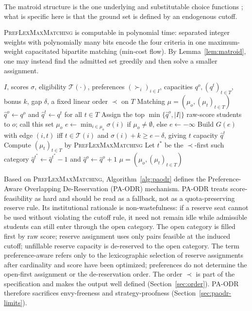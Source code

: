 \documentclass[runningheads]{llncs}
\newcommand{\T}{\mathcal{T}}
\begin{document}
The matroid structure is the one underlying \cite{Flei03a} and substitutable choice functions \cite{GKK+17a,KoSo16a}; what is specific here is that the ground set is defined by an endogenous cutoff.

\begin{nremark}[Computation]
\label{rem:computation}
\textsc{PrefLexMaxMatching} is computable in polynomial time: separated integer weights with polynomially many bits encode the four criteria in one maximum-weight capacitated bipartite matching (min-cost flow). By Lemma~\ref{lem:matroid}, one may instead find the admitted set greedily and then solve a smaller assignment.
\end{nremark}

\begin{algorithm}[t]
\caption{Preference-Aware Overlapping De-Reservation (PA-ODR)}
\label{alg:paodr}
\begin{algorithmic}[1]
\Require $I$, scores $\sigma$, eligibility $\T(\cdot)$, preferences $(\succ_i)_{i\in I}$, capacities $q^o,(q^t)_{t\in T}$, bonus $k$, gap $\delta$, a fixed linear order $\prec$ on $T$
\Ensure Matching $\mu=(\mu_o,(\mu_t)_{t\in T})$
\State $\hat q^o\gets q^o$ and $\hat q^t\gets q^t$ for all $t\in T$
\Loop
    \State Assign the top $\min\{\hat q^o,|I|\}$ raw-score students to $o$; call this set $\mu_o$
    \State $e\gets\min_{i\in\mu_o}\sigma(i)$ if $\mu_o\neq\emptyset$, else $e\gets-\infty$
    \State Build $G(e)$ with edge $(i,t)$ iff $t\in\T(i)$ and $\sigma(i)+k\ge e-\delta$, giving $t$ capacity $\hat q^t$
    \State Compute $(\mu_t)_{t\in T}$ by \textsc{PrefLexMaxMatching}
        \State Let $t^\ast$ be the $\prec$-first such category
        \State $\hat q^{t^\ast}\gets\hat q^{t^\ast}-1$ and $\hat q^o\gets\hat q^o+1$
    \Else
        \State \Return $\mu=(\mu_o,(\mu_t)_{t\in T})$
    \EndIf
\EndLoop
\end{algorithmic}
\end{algorithm}

Based on \textsc{PrefLexMaxMatching}, Algorithm~\ref{alg:paodr} defines the Preference-Aware Overlapping De-Reservation (PA-ODR) mechanism. PA-ODR treats score-feasibility as hard and should be read as a fallback, not as a quota-preserving reserve rule. Its institutional rationale is non-wastefulness: if a reserve seat cannot be used without violating the cutoff rule, it need not remain idle while admissible students can still enter through the open category. The open category is filled first by raw score; reserve assignment uses only pairs feasible at the induced cutoff; unfillable reserve capacity is de-reserved to the open category. The term preference-aware refers only to the lexicographic selection of reserve assignments after cardinality and score have been optimized; preferences do not determine the open-first assignment or the de-reservation order. The order $\prec$ is part of the specification and makes the output well defined (Section~\ref{sec:order}). PA-ODR therefore sacrifices envy-freeness and strategy-proofness (Section~\ref{sec:paodr-limits}).
\end{document}
